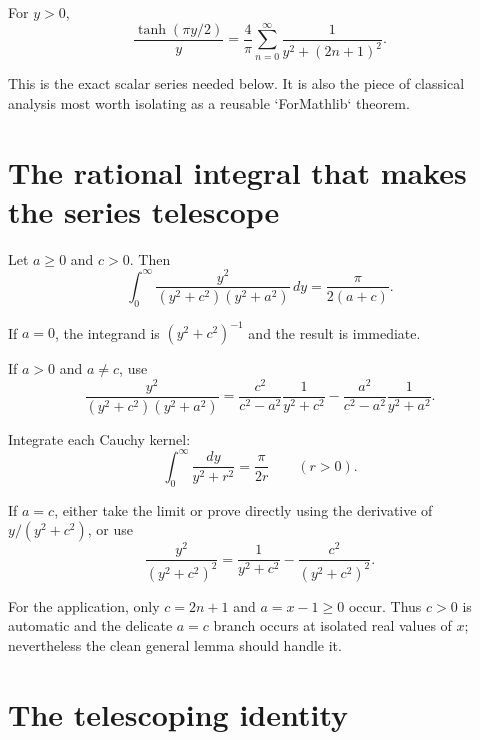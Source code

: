 \begin{theorem}
For $y>0$,
\begin{equation}
  \frac{\tanh(\pi y/2)}{y}
  =\frac4\pi\sum_{n=0}^\infty
    \frac1{y^2+(2n+1)^2}.
  \tag{tanh-odd}\label{tanh-odd}
\end{equation}
\end{theorem}

This is the exact scalar series needed below. It is also the piece of classical analysis most worth isolating as a reusable `ForMathlib` theorem.

\section{The rational integral that makes the series telescope}

\begin{lemma}
Let $a\ge0$ and $c>0$. Then
\begin{equation}
  \int_0^\infty
  \frac{y^2}{(y^2+c^2)(y^2+a^2)}\,dy
  =\frac\pi{2(a+c)}.
  \tag{two-cauchy}\label{two-cauchy}
\end{equation}
\end{lemma}

\begin{proofoutline}
\item If $a=0$, the integrand is $(y^2+c^2)^{-1}$ and the result is immediate.
\item If $a>0$ and $a\ne c$, use
\[
\frac{y^2}{(y^2+c^2)(y^2+a^2)}
=\frac{c^2}{c^2-a^2}\frac1{y^2+c^2}
 -\frac{a^2}{c^2-a^2}\frac1{y^2+a^2}.
\]
\item Integrate each Cauchy kernel:
\[
  \int_0^\infty\frac{dy}{y^2+r^2}=\frac\pi{2r}
  \qquad(r>0).
\]
\item If $a=c$, either take the limit or prove directly using the derivative of $y/(y^2+c^2)$, or use
\[
  \frac{y^2}{(y^2+c^2)^2}
  =\frac1{y^2+c^2}-\frac{c^2}{(y^2+c^2)^2}.
\]
\end{proofoutline}

For the application, only $c=2n+1$ and $a=x-1\ge0$ occur. Thus $c>0$ is automatic and the delicate $a=c$ branch occurs at isolated real values of $x$; nevertheless the clean general lemma should handle it.

\section{The telescoping identity}

